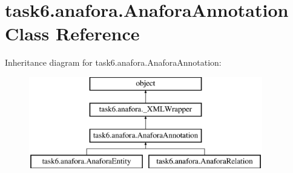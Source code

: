 \hypertarget{classtask6_1_1anafora_1_1AnaforaAnnotation}{}\section{task6.\+anafora.\+Anafora\+Annotation Class Reference}
\label{classtask6_1_1anafora_1_1AnaforaAnnotation}
Inheritance diagram for task6.\+anafora.\+Anafora\+Annotation\+:\begin{figure}[H]
\begin{center}
\leavevmode
\includegraphics[height=4.000000cm]{classtask6_1_1anafora_1_1AnaforaAnnotation}
\end{center}
\end{figure}

